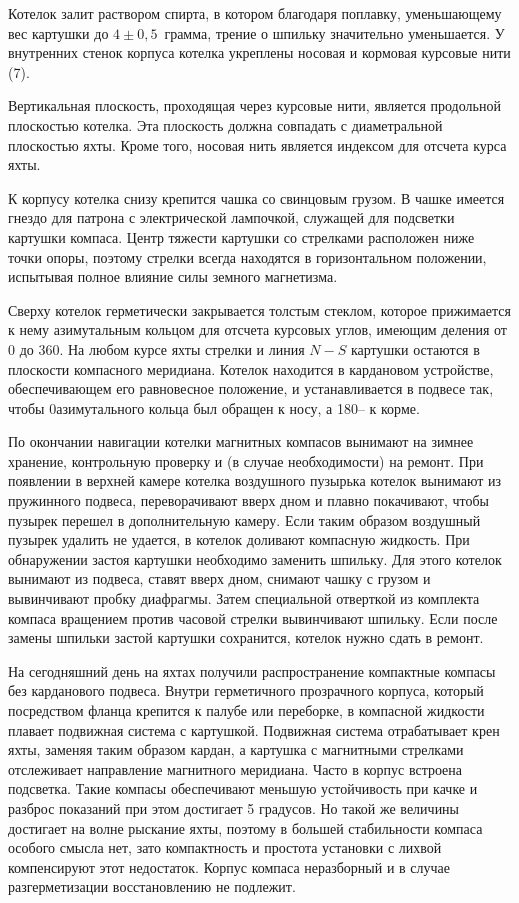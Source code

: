 Котелок залит раствором спирта, в котором благодаря поплавку,
уменьшающему вес картушки до $4 \pm 0,5$~грамма, трение о шпильку
значительно уменьшается. У внутренних стенок корпуса котелка укреплены
носовая и кормовая курсовые нити (7).

Вертикальная плоскость, проходящая через курсовые нити, является
продольной плоскостью котелка. Эта плоскость должна совпадать с
диаметральной плоскостью яхты. Кроме того, носовая нить является
индексом для отсчета курса яхты.

К корпусу котелка снизу крепится чашка со свинцовым грузом. В чашке
имеется гнездо для патрона с электрической лампочкой, служащей для
подсветки картушки компаса. Центр тяжести картушки со стрелками
расположен ниже точки опоры, поэтому стрелки всегда находятся в
горизонтальном положении, испытывая полное влияние силы земного
магнетизма.

Сверху котелок герметически закрывается толстым стеклом, которое
прижимается к нему азимутальным кольцом для отсчета курсовых углов,
имеющим деления от 0 до 360\gr. На любом курсе яхты стрелки и линия
$N-S$ картушки остаются в плоскости компасного меридиана. Котелок
находится в кардановом устройстве, обеспечивающем его равновесное
положение, и устанавливается в подвесе так, чтобы 0\gr азимутального
кольца был обращен к носу, а 180\gr \--- к корме.

По окончании навигации котелки магнитных компасов вынимают на зимнее
хранение, контрольную проверку и (в случае необходимости) на
ремонт. При появлении в верхней камере котелка воздушного пузырька
котелок вынимают из пружинного подвеса, переворачивают вверх дном и
плавно покачивают, чтобы пузырек перешел в дополнительную камеру. Если
таким образом воздушный пузырек удалить не удается, в котелок доливают
компасную жидкость. При обнаружении застоя картушки необходимо
заменить шпильку. Для этого котелок вынимают из подвеса, ставят вверх
дном, снимают чашку с грузом и вывинчивают пробку диафрагмы. Затем
специальной отверткой из комплекта компаса вращением против часовой
стрелки вывинчивают шпильку. Если после замены шпильки застой картушки
сохранится, котелок нужно сдать в ремонт.

На сегодняшний день на яхтах получили распространение компактные
компасы без карданового подвеса. Внутри герметичного прозрачного
корпуса, который посредством фланца крепится к палубе или переборке, в
компасной жидкости плавает подвижная система с картушкой. Подвижная
система отрабатывает крен яхты, заменяя таким образом кардан, а
картушка с магнитными стрелками отслеживает направление магнитного
меридиана. Часто в корпус встроена подсветка. Такие компасы
обеспечивают меньшую устойчивость при качке и разброс показаний при
этом достигает 5 градусов. Но такой же величины достигает на волне
рыскание яхты, поэтому в большей стабильности компаса особого смысла
нет, зато компактность и простота установки с лихвой компенсируют этот
недостаток. Корпус компаса неразборный и в случае разгерметизации
восстановлению не подлежит.

